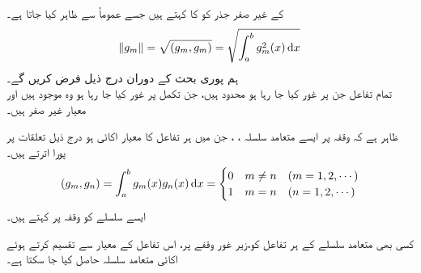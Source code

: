  کے غیر صفر جذر کو  کا  کہتے ہیں جسے عموماً  سے ظاہر کیا جاتا ہے۔
\begin{align}
\norm{g_m}=\sqrt{(g_m,g_m)}=\sqrt{\int_{a}^{b} g_m^2(x)\dif x}
\end{align}
ہم پوری بحث کے دوران درج ذیل فرض کریں گے۔\\
 \quad تمام تفاعل جن پر غور کیا جا رہا ہو محدود ہیں، جن تکمل پر غور کیا جا رہا ہو وہ موجود ہیں اور معیار غیر صفر ہیں۔

 ظاہر ہے کہ وقفہ  پر ایسے متعامد سلسلہ ، ،  جن  میں ہر تفاعل کا معیار اکائی  ہو درج ذیل تعلقات پر پورا اترتے ہیں۔
\begin{align}
(g_m,g_n)=\int_{a}^{b}g_m(x) g_n(x)\dif x=
\begin{cases}
0 & m\ne n \quad (m=1,2,\cdots)\\
1& m=n \quad (n=1,2,\cdots)
\end{cases}
\end{align}
ایسے سلسلے کو وقفہ  پر  کہتے ہیں۔

کسی بھی متعامد سلسلے کے ہر تفاعل کو،زیر غور وقفے پر، اس تفاعل کے  معیار سے تقسیم کرتے ہوئے اکائی متعامد سلسلہ حاصل کیا جا سکتا ہے۔ 

